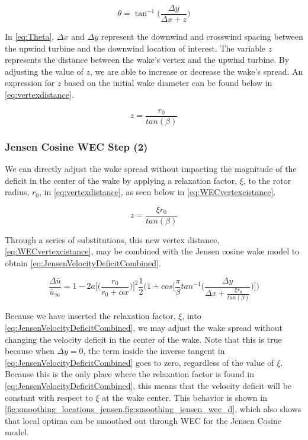 \documentclass{jpconf}
\begin{document}
\begin{equation}
	\theta = \tan^{-1}\Big( \frac{\Delta y}{\Delta x + z} \Big)
	\label{eq:Theta}
\end{equation}

In \cref{eq:Theta}, $\Delta x$ and $\Delta y$ represent the downwind and crosswind spacing between the upwind turbine and the downwind location of interest. The variable $z$ represents the distance between the wake's vertex and the upwind turbine. By adjusting the value of $z$, we are able to increase or decrease the wake's spread. An expression for $z$ based on the initial wake diameter can be found below in \cref{eq:vertexdistance}.

\begin{equation}
	z = \frac{r_0}{tan(\beta)}
	\label{eq:vertexdistance}
\end{equation} 


\subsubsection{Jensen Cosine WEC Step (2)}
We can directly adjust the wake spread without impacting the magnitude of the deficit in the center of the wake by applying a relaxation factor, $\xi$, to the rotor radius, $r_0$, in \cref{eq:vertexdistance}, as seen below in \cref{eq:WECvertexcistance}.

\begin{equation}
	z = \frac{\xi r_0}{tan(\beta)}
	\label{eq:WECvertexcistance}
\end{equation}

Through a series of substitutions, this new vertex distance, \cref{eq:WECvertexcistance}, may be combined with the Jensen cosine wake model to obtain \cref{eq:JensenVelocityDeficitCombined}.

\begin{equation}
	\frac{\Delta \bar{u}}{\bar{u}_\infty} = 1 - 2a \Bigg[  \bigg(\frac{r_0}{r_0 + \alpha x} \bigg) \Bigg]^2 \frac{1}{2} \Bigg(1 + cos\Bigg[\frac{\pi}{\beta} tan^{-1}\Bigg(\frac{\Delta y}{\Delta x + \frac{\xi r_0}{tan(\beta)}} \Bigg) \Bigg] \Bigg)
	\label{eq:JensenVelocityDeficitCombined}
\end{equation}

Because we have inserted the relaxation factor, $\xi$, into \cref{eq:JensenVelocityDeficitCombined}, we may adjust the wake spread without changing the velocity deficit in the center of the wake. Note that this is true because when $\Delta y = 0$, the term inside the inverse tangent in \cref{eq:JensenVelocityDeficitCombined} goes to zero, regardless of the value of $\xi$. Because this is the only place where the relaxation factor is found in \cref{eq:JensenVelocityDeficitCombined}, this means that the velocity deficit will be constant with respect to $\xi$ at the wake center. This behavior is shown in \cref{fig:smoothing_locations_jensen,fig:smoothing_jensen_wec_d}, which also shows that local optima can be smoothed out through WEC for the Jensen Cosine model.
\end{document}
